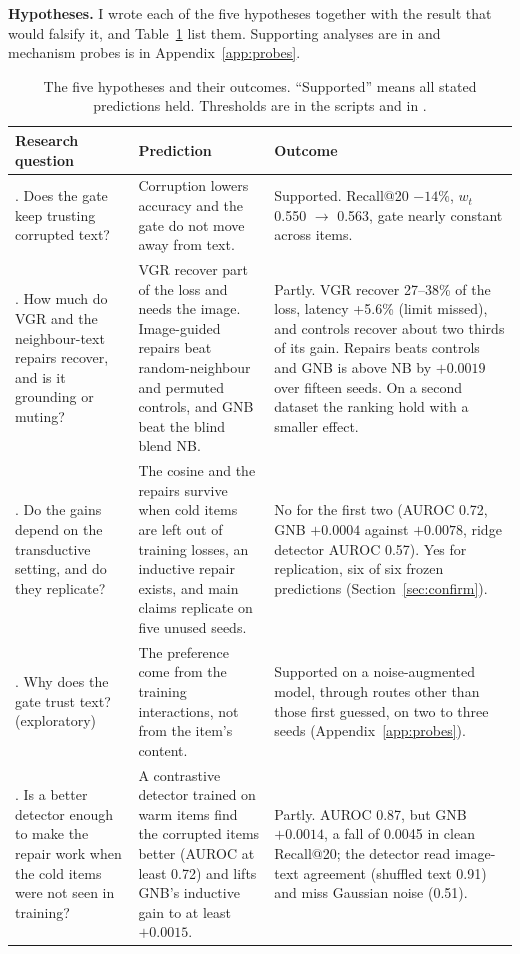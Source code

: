 \documentclass[conference]{IEEEtran}
\newcommand{\code}[1]{\texttt{\detokenize{#1}}}
\begin{document}
\textbf{Hypotheses.} I wrote each of the five hypotheses together with the result that would falsify it, and Table~\ref{tab:hyp} list them. Supporting analyses are in \code{docs/hypotheses.md} and mechanism probes is in Appendix~\ref{app:probes}.

\begin{table}[!t]
\centering\footnotesize
\caption{The five hypotheses and their outcomes. ``Supported'' means all stated predictions held. Thresholds are in the scripts and in \code{docs/hypotheses.md}.}
\label{tab:hyp}
\renewcommand{\arraystretch}{1.0}
\begin{tabularx}{\textwidth}{@{}>{\raggedright\arraybackslash}p{3.7cm}>{\raggedright\arraybackslash}p{5.3cm}>{\raggedright\arraybackslash}X@{}}
\toprule
Research question & Prediction & Outcome \\
\midrule
1. Does the gate keep trusting corrupted text? & Corruption lowers accuracy and the gate do not move away from text. & Supported. Recall@20 $-14\%$, $w_t$ 0.550 $\to$ 0.563, gate nearly constant across items. \\
2. How much do VGR and the neighbour-text repairs recover, and is it grounding or muting? & VGR recover part of the loss and needs the image. Image-guided repairs beat random-neighbour and permuted controls, and GNB beat the blind blend NB. & Partly. VGR recover 27--38\% of the loss, latency +5.6\% (limit missed), and controls recover about two thirds of its gain. Repairs beats controls and GNB is above NB by $+0.0019$ over fifteen seeds. On a second dataset the ranking hold with a smaller effect. \\
3. Do the gains depend on the transductive setting, and do they replicate? & The cosine and the repairs survive when cold items are left out of training losses, an inductive repair exists, and main claims replicate on five unused seeds. & No for the first two (AUROC 0.72, GNB $+0.0004$ against $+0.0078$, ridge detector AUROC 0.57). Yes for replication, six of six frozen predictions (Section~\ref{sec:confirm}). \\
4. Why does the gate trust text? (exploratory) & The preference come from the training interactions, not from the item's content. & Supported on a noise-augmented model, through routes other than those first guessed, on two to three seeds (Appendix~\ref{app:probes}). \\
5. Is a better detector enough to make the repair work when the cold items were not seen in training? & A contrastive detector trained on warm items find the corrupted items better (AUROC at least 0.72) and lifts GNB's inductive gain to at least $+0.0015$. & Partly. AUROC 0.87, but GNB $+0.0014$, a fall of 0.0045 in clean Recall@20; the detector read image-text agreement (shuffled text 0.91) and miss Gaussian noise (0.51). \\
\bottomrule
\end{tabularx}
\end{table}
\end{document}
